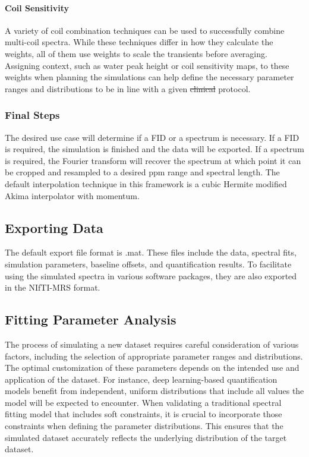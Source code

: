 \documentclass[AMA,LATO1COL]{WileyNJD-v2}
\providecommand{\DIFadd}[1]{{\protect\color{blue}\uwave{#1}}} %
\providecommand{\DIFdel}[1]{{\protect\color{red}\sout{#1}}}                      %
\providecommand{\DIFaddbegin}{} %
\providecommand{\DIFaddend}{} %
\providecommand{\DIFdelbegin}{} %
\providecommand{\DIFdelend}{} %
\begin{document}
 
\paragraph{Coil Sensitivity}
A variety of coil combination techniques can be used to successfully combine multi-coil spectra. While these techniques differ in how they calculate the weights, all of them use weights to scale the transients before averaging. Assigning context, such as water peak height or coil sensitivity maps, to these weights when planning the simulations can help define the necessary parameter ranges and distributions to be in line with a given \DIFdelbegin \DIFdel{clinical }\DIFdelend \DIFaddbegin \DIFadd{acquisition }\DIFaddend protocol.

\subsubsection{Final Steps} The desired use case will determine if a FID or a spectrum is necessary. If a FID is required, the simulation is finished and the data will be exported. If a spectrum is required, the Fourier transform will recover the spectrum at which point it can be cropped and resampled to a desired ppm range and spectral length. The default interpolation technique in this framework is a cubic Hermite modified Akima interpolator with momentum.


\subsection{Exporting Data}\label{subsec:exporting data}
The default export file format is .mat. These files include the data, spectral fits, simulation parameters, baseline offsets, and quantification results. To facilitate using the simulated spectra in various software packages, they are also exported in the NIfTI-MRS format\cite{Clarke2022}.

\subsection{Fitting Parameter Analysis}\label{subsec:Fitting Parameter Analysis}
The process of simulating a new dataset requires careful consideration of various factors, including the selection of appropriate parameter ranges and distributions. The optimal customization of these parameters depends on the intended use and application of the dataset. For instance, deep learning-based quantification models benefit from independent, uniform distributions that include all values the model will be expected to encounter. When validating a traditional spectral fitting model that includes soft constraints, it is crucial to incorporate those constraints when defining the parameter distributions. This ensures that the simulated dataset accurately reflects the underlying distribution of the target dataset. 
\end{document}
